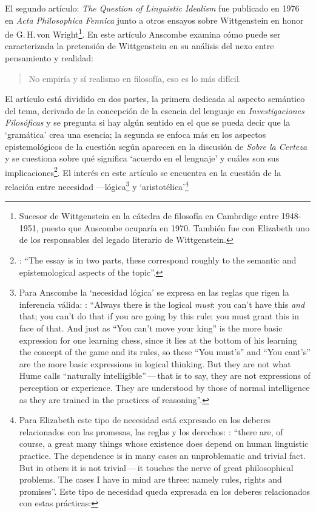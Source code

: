 El segundo artículo: \emph{The Question of Linguistic Idealism} fue publicado en 1976 en \emph{Acta Philosophica Fennica} junto a otros ensayos sobre Wittgenstein en honor de G.\,H.\,von Wright\footnote{Sucesor de Wittgenstein en la cátedra de filosofía en Cambrdige entre 1948-1951, puesto que Anscombe ocuparía en 1970. También fue con Elizabeth uno de los responsables del legado literario de Wittgenstein.}. En este artículo Anscombe examina cómo puede ser caracterizada la pretensión de Wittgenstein en su análisis del nexo entre pensamiento y realidad: \blockquote[{\Cite[VI, 23]{wittgenstein1956remmathes}}]{No empiría y sí realismo en filosofía, eso es lo más difícil.}. El artículo está dividido en dos partes, la primera dedicada al aspecto semántico del tema, derivado de la concepción de la esencia del lenguaje en \emph{Investigaciones Filosóficas} y se pregunta si hay algún sentido en el que se pueda decir que la `gramática' crea una esencia; la segunda se enfoca más en los aspectos epistemológicos de la cuestión según aparecen en la discusión de \emph{Sobre la Certeza} y se cuestiona sobre qué significa `acuerdo en el lenguaje' y cuáles son sus implicaciones\footnote{\cite[Cf.][215]{teichmann2008ans}: \enquote{The essay is in two parts, these correspond roughly to the semantic and epistemological aspects of the topic}.}. El interés en este artículo se encuentra en la cuestión de la relación entre necesidad ---lógica\footnote{Para Anscombe la `necesidad lógica' se expresa en las reglas que rigen la inferencia válida: \Cite[Cf.][121]{anscombe1981parmenides:qli}: \enquote{Always there is the logical \emph{must}: you can't have this \emph{and} that; you can't do that if you are going by this rule; you must grant this in face of that. And just as ``You can't move your king'' is the more basic expression for one learning chess, since it lies at the bottom of his learning the concept of the game and its rules, so these ``You must's'' and ``You cant's'' are the more basic expressions in logical thinking. But they are not what Hume calls ``naturally intelligible''\,---\,that is to say, they are not expressions of perception or experience. They are understood by those of normal intelligence as they are trained in the practices of reasoning}.} y `aristotélica'\footnote{Para Elizabeth este tipo de necesidad está expresado en los deberes relacionados con las promesas, las reglas y los derechos: \Cite[Cf.][118]{anscombe1981parmenides:qli}: \enquote{there are, of course, a great many things whose existence does depend on human linguistic practice. The dependence is in many cases an unproblematic and trivial fact. But in others it is not trivial\,---\,it touches the nerve of great philosophical problems. The cases I have in mind are three: namely rules, rights and promises}. Este tipo de necesidad queda expresada en los deberes relacionados con estas prácticas:
}
